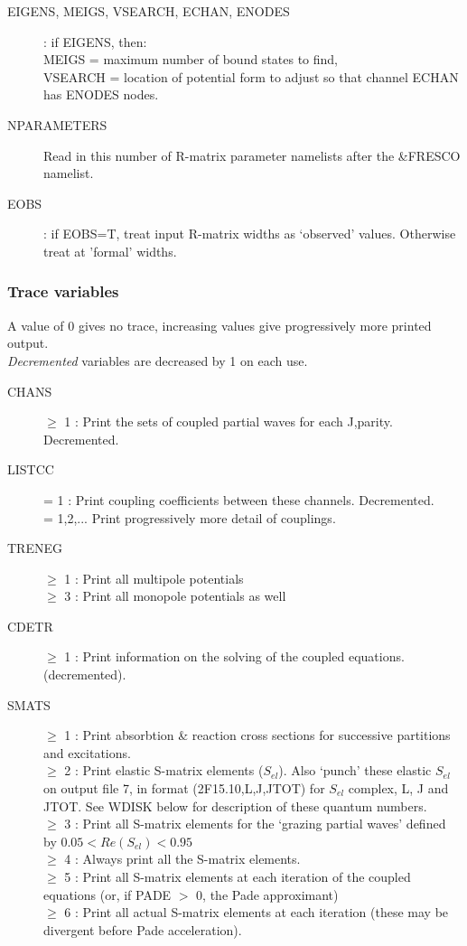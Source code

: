 \documentclass[11pt]{article}
\begin{document}
\begin{description}
\item[EIGENS, MEIGS, VSEARCH, ECHAN, ENODES] : if EIGENS, then: \\
MEIGS = maximum number of bound states to find, \\
VSEARCH =  location of potential form to adjust so that channel ECHAN has ENODES nodes.

\item[NPARAMETERS] Read in this number of R-matrix parameter namelists after the \&FRESCO namelist.

\item[EOBS] : if EOBS=T, treat input R-matrix widths as `observed' values. Otherwise treat at 'formal' widths.
\end{description}

\subsubsection{Trace variables}
A value of 0 gives no trace,
increasing values give progressively more printed output.\\
{\em Decremented} variables are decreased by 1 on each use.

\begin{description}
\item[CHANS] $\geq$ 1 : Print the sets of coupled partial waves for each J,parity.
Decremented.

\item[LISTCC] = 1 : Print coupling coefficients between these channels. Decremented.
\\  = 1,2,... Print progressively more detail of couplings.
\item[TRENEG] $\geq$ 1 : Print all multipole potentials
\\  $\geq$ 3 : Print all monopole potentials as well
\item[CDETR]  $\geq$ 1 : Print information on the solving of the coupled equations.
(decremented).
\item[SMATS]  $\geq$ 1 : Print absorbtion \& reaction cross sections for successive
partitions and excitations.
\\  $\geq$ 2 : Print elastic S-matrix elements ($S_{el}$).
Also `punch' these elastic $S_{el}$ on output file 7,
in format (2F15.10,L,J,JTOT) for $S_{el}$ complex, L, J and JTOT.
See WDISK below for description of these quantum numbers.
\\  $\geq$ 3 : Print all S-matrix elements for the `grazing partial waves'
defined by $0.05 < Re(S_{el}) < 0.95$
\\  $\geq$ 4 : Always print all the S-matrix elements.
\\  $\geq$ 5 : Print all S-matrix elements at each iteration of the coupled
equations (or, if PADE  $>$ 0, the Pade approximant)
\\  $\geq$ 6 : Print all actual S-matrix elements at each iteration (these
may be divergent before Pade acceleration).


\end{description}
\end{document}
